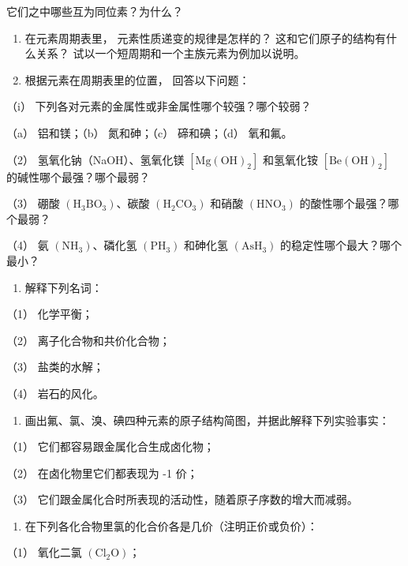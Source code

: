 它们之中哪些互为同位素？为什么？

\begin{enumerate}[start=5]
\item
  在元素周期表里， 元素性质递变的规律是怎样的？
  这和它们原子的结构有什么关系？
  试以一个短周期和一个主族元素为例加以说明。
\item
  根据元素在周期表里的位置， 回答以下问题：
\end{enumerate}

（i） 下列各对元素的金属性或非金属性哪个较强？哪个较弱？

（a） 铝和镁；（b） 氮和砷；（c） 碲和碘；（d） 氧和氟。

（2） 氢氧化钠（NaOH）、氢氧化镁 \(\left[\mathrm{Mg(OH)}_{2}\right]\)
和氢氧化铵 \(\left[\mathrm{Be(OH)}_{2}\right]\)
的碱性哪个最强？哪个最弱？

（3） 硼酸 \(\left(\mathrm{H}_{3} \mathrm{BO}_{3}\right)\)、碳酸
\(\left(\mathrm{H}_{2} \mathrm{CO}_{3}\right)\) 和硝酸
\(\left(\mathrm{HNO}_{3}\right)\) 的酸性哪个最强？哪个最弱？

（4） 氨 \(\left(\mathrm{NH}_{3}\right)\)、磷化氢
\(\left(\mathrm{PH}_{3}\right)\) 和砷化氢
\(\left(\mathrm{AsH}_{3}\right)\) 的稳定性哪个最大？哪个最小？

\begin{enumerate}[start=7]
\item
  解释下列名词：
\end{enumerate}

（1） 化学平衡；

（2） 离子化合物和共价化合物；

（3） 盐类的水解；

（4） 岩石的风化。

\begin{enumerate}[start=8]
\item
  画出氟、氯、溴、碘四种元素的原子结构简图，并据此解释下列实验事实：
\end{enumerate}

（1） 它们都容易跟金属化合生成卤化物；

（2） 在卤化物里它们都表现为 -1 价；

（3） 它们跟金属化合时所表现的活动性，随着原子序数的增大而减弱。

\begin{enumerate}[start=9]
\item
  在下列各化合物里氯的化合价各是几价（注明正价或负价）：
\end{enumerate}

（1） 氧化二氯 \(\left(\mathrm{Cl}_{2}\mathrm{O}\right)\)；

